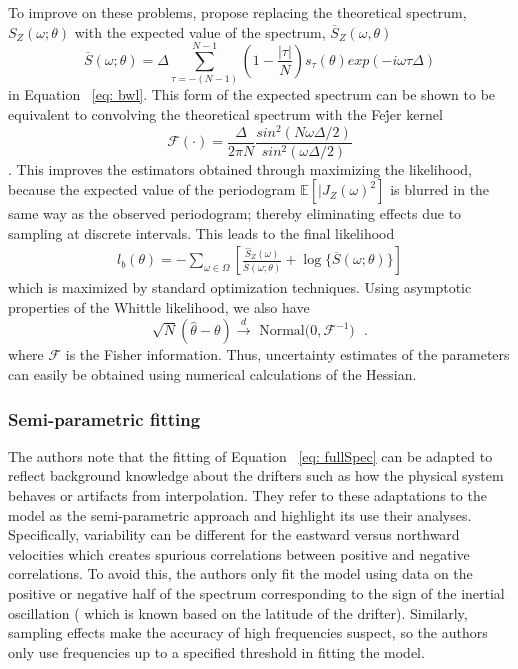 \documentclass{stat572Style}
\begin{document}
To improve on these problems, \citep{Sykulski2013} propose replacing the theoretical spectrum, $S_{Z}(\omega; \theta)$ with the expected value of the spectrum, $\overline{S}_{Z}(\omega, \theta)$\begin{equation}
\overline{S}(\omega; \theta) = \Delta \sum_{\tau = - (N - 1)}^{N-1} \left(1 - \frac{|\tau|}{N} \right)s_{\tau}(\theta) exp ( - i \omega \tau \Delta)
\end{equation}
in Equation ~\ref{eq: bwl}. This form of the expected spectrum can be shown to be equivalent to convolving the theoretical spectrum with the Fe\'{j}er kernel 
\begin{equation}
\mathcal{F}(\cdot) = \frac{\Delta}{2\pi N} \frac{sin^{2}(N \omega \Delta/2)}{sin^{2}(\omega \Delta /2)} 
\end{equation} \citep{Sykulski2013}. This improves the estimators obtained through maximizing the likelihood, because the expected value of the periodogram $\mathbb{E}[|J_{Z}(\omega)^{2}]$ is blurred in the same way as the observed periodogram; thereby eliminating effects due to sampling at discrete intervals. This leads to the final likelihood
\begin{align}
l_{b}(\theta) = - \sum_{\omega \in \Omega} \left[\frac{\hat{S}_{Z}(\omega)}{\overline{S}(\omega; \theta)} + \log \{ \overline{S} (\omega; \theta) \}\right]
\end{align}
which is maximized by standard optimization techniques. Using asymptotic properties of the Whittle likelihood, we also have 
\begin{equation}
\label{eq: fisher}
\sqrt{N}(\hat{\theta} - \theta) \overset{d}{\rightarrow} \text{ Normal($0, \mathcal{F}^{-1})$ }.
\end{equation}
where $\mathcal{F}$ is the Fisher information. Thus, uncertainty estimates of the parameters can easily be obtained using numerical calculations of the Hessian. 

\subsubsection{Semi-parametric fitting}
The authors note that the fitting of Equation ~\ref{eq: fullSpec} can be adapted to reflect background knowledge about the drifters such as how the physical system behaves or artifacts from interpolation. They refer to these adaptations to the model as the semi-parametric approach and highlight its use  their analyses. Specifically,  variability can be different for the eastward versus northward velocities  which creates spurious correlations between positive and negative correlations. To avoid this, the authors only fit the model using data on the positive or negative half of the spectrum corresponding to the sign of the inertial oscillation ( which is known based on the latitude of the drifter).  Similarly, sampling effects make the accuracy of high frequencies suspect, so the authors only use frequencies up to a specified threshold in fitting the model. 
\end{document}

